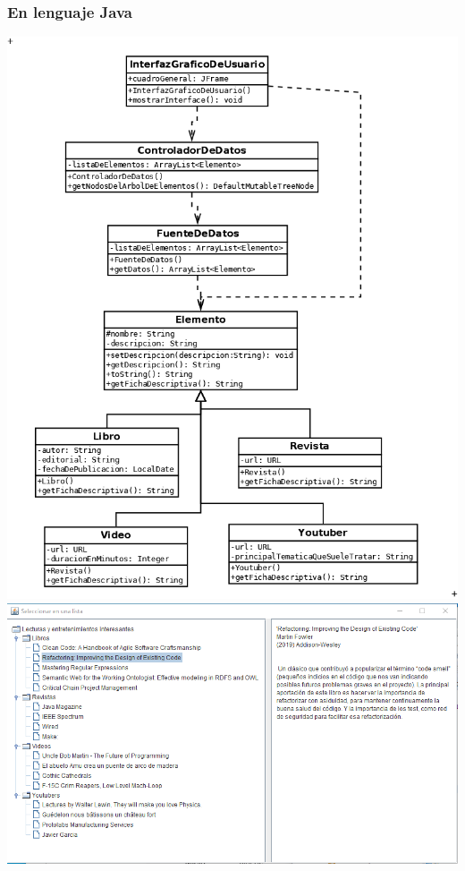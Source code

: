 \documentclass[spanish,12pt,a4paper,final,oneside]{book}
\begin{document}
\subsubsection*{En lenguaje Java} \lstset{language=Java} 
\includegraphics[width=\textwidth]{Seleccion Arborea - diagrama de clases}
\includegraphics[width=\textwidth]{Seleccion Arborea - pantallazo - Java}

\end{document}
